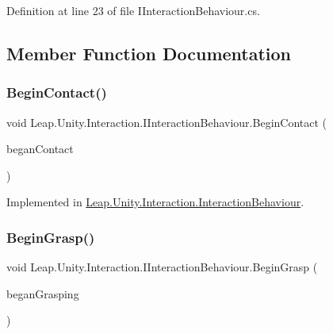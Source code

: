 Definition at line 23 of file I\+Interaction\+Behaviour.\+cs.



\subsection{Member Function Documentation}
\mbox{\label{interface_leap_1_1_unity_1_1_interaction_1_1_i_interaction_behaviour_a577c47a20b0f2ae933bd20d7f1b47498}} 
\subsubsection{\texorpdfstring{BeginContact()}{BeginContact()}}
{\footnotesize\ttfamily void Leap.\+Unity.\+Interaction.\+I\+Interaction\+Behaviour.\+Begin\+Contact (\begin{DoxyParamCaption}\item[{List$<$ \mbox{\hyperlink{class_leap_1_1_unity_1_1_interaction_1_1_interaction_controller}{Interaction\+Controller}} $>$}]{began\+Contact }\end{DoxyParamCaption})}



Implemented in \mbox{\hyperlink{class_leap_1_1_unity_1_1_interaction_1_1_interaction_behaviour_afe37f016395a6c5834a9c51aab533a35}{Leap.\+Unity.\+Interaction.\+Interaction\+Behaviour}}.

\mbox{\label{interface_leap_1_1_unity_1_1_interaction_1_1_i_interaction_behaviour_af603fe6d03b61ae9e5d05c7809b05160}} 
\subsubsection{\texorpdfstring{BeginGrasp()}{BeginGrasp()}}
{\footnotesize\ttfamily void Leap.\+Unity.\+Interaction.\+I\+Interaction\+Behaviour.\+Begin\+Grasp (\begin{DoxyParamCaption}\item[{List$<$ \mbox{\hyperlink{class_leap_1_1_unity_1_1_interaction_1_1_interaction_controller}{Interaction\+Controller}} $>$}]{began\+Grasping }\end{DoxyParamCaption})}



